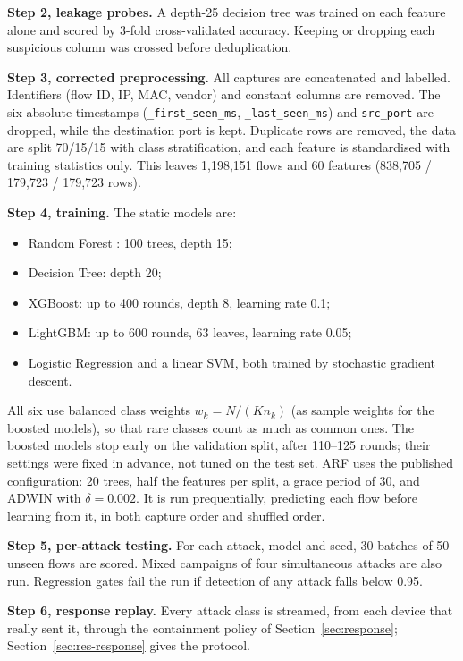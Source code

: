 \documentclass[conference]{IEEEtran}
\newcommand{\col}[1]{\texttt{\small #1}}
\begin{document}
\textbf{Step 2, leakage probes.} A depth-25 decision tree was trained on each feature alone and scored by 3-fold cross-validated accuracy. Keeping or dropping each suspicious column was crossed before deduplication.

\textbf{Step 3, corrected preprocessing.} All captures are concatenated and labelled. Identifiers (flow ID, IP, MAC, vendor) and constant columns are removed. The six absolute timestamps (\col{*\_first\_seen\_ms}, \col{*\_last\_seen\_ms}) and \col{src\_port} are dropped, while the destination port is kept. Duplicate rows are removed, the data are split 70/15/15 with class stratification, and each feature is standardised with training statistics only. This leaves 1,198,151 flows and 60 features (838,705 / 179,723 / 179,723 rows).

\textbf{Step 4, training.} The static models are:
\begin{itemize}
    \item Random Forest \cite{b16}: 100 trees, depth 15;
    \item Decision Tree: depth 20;
    \item XGBoost: up to 400 rounds, depth 8, learning rate 0.1;
    \item LightGBM: up to 600 rounds, 63 leaves, learning rate 0.05;
    \item Logistic Regression and a linear SVM, both trained by stochastic gradient descent.
\end{itemize}
All six use balanced class weights $w_k = N/(K n_k)$ (as sample weights for the boosted models), so that rare classes count as much as common ones. The boosted models stop early on the validation split, after 110--125 rounds; their settings were fixed in advance, not tuned on the test set. ARF uses the published configuration: 20 trees, half the features per split, a grace period of 30, and ADWIN with $\delta = 0.002$. It is run prequentially, predicting each flow before learning from it, in both capture order and shuffled order.

\textbf{Step 5, per-attack testing.} For each attack, model and seed, 30 batches of 50 unseen flows are scored. Mixed campaigns of four simultaneous attacks are also run. Regression gates fail the run if detection of any attack falls below 0.95.

\textbf{Step 6, response replay.} Every attack class is streamed, from each device that really sent it, through the containment policy of Section~\ref{sec:response}; Section~\ref{sec:res-response} gives the protocol.
\end{document}
